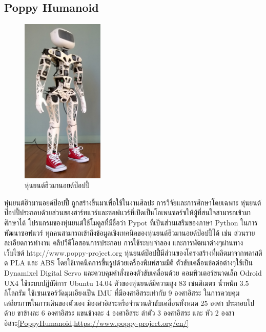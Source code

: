 \subsection*{Poppy Humanoid}
\begin{figure}[ht]
    \centering
    \includegraphics[width=0.35\textwidth]{chapter2/images/PoppyHumanoid1.png}
    \caption{หุ่นยนต์ฮิวมานอยด์ป๊อปปี้}
    \label{fig:poppy_humanoid}
\end{figure}
หุ่นยนต์ฮิวมานอยด์ป๊อปปี้ ถูกสร้างขึ้นมาเพื่อใช้ในงานศิลปะ การวิจัยและการศึกษาโดยเฉพาะ 
หุ่นยนต์ป๊อปปี้ประกอบด้วยส่วนของฮาร์ทแวร์และซอฟแวร์ที่เปิดเป็นโอเพนซอร์ซให้ผู้ที่สนใจสามารถเข้ามาศึกษาได้
โปรแกรมของหุ่นยนต์ใช้โมดูลที่มีชื่อว่า Pypot ที่เป็นส่วนเสริมของภาษา Python ในการพัฒนาซอฟแวร์
ทุกคนสามารถเข้าถึงข้อมูลเชิงเทคนิคของหุ่นยนต์ฮิวมานอยด์ป๊อปปี้ได้ เช่น ส่วนรายละเอียดการทำงาน
คลิปวีดีโอสอนการประกอบ การใช้ระบบจำลอง และการพัฒนาต่างๆผ่านทางเว็บไซต์ http://www.poppy-project.org 
หุ่นยนต์ป๊อปปี้มีส่วนของโครงสร้างที่ผลิตมาจากพลาสติด PLA และ ABS โดยใช้เทคนิคการขึ้นรูปด้วยเครื่องพิมพ์สามมิติ
ตัวขับเคลื่อนข้อต่อต่างๆใช้เป็น Dynamixel Digital Servo และควบคุมคำสั่งของตัวขับเคลื่อนด้วย 
คอมพิวเตอร์ขนาดเล็ก Odroid UX4 ใช้ระบบปฎิบัติการ Ubuntu 14.04 
ตัวของหุ่นยนต์มีความสูง 83 เซนติเมตร น้ำหนัก 3.5 กิโลกรัม 
ใช้เซนเซอร์วัดมุมเอียงเป็น IMU ที่มีองศาอิสระเท่ากับ 9 องศาอิสระ ในการควบคุมเสถียรภาพในการเดินของตัวเอง
มีองศาอิสระหรือจำนวนตัวขับเคลื่อนทั้งหมด 25 องศา ประกอบไปด้วย ขาข้างละ 6 องศาอิสระ แขนข้างละ 4 องศาอิสระ 
ลำตัว 3 องศาอิสระ และ หัว 2 องสาอิสระ\ref{PoppyHumanoid,https://www.poppy-project.org/en/}

\clearpage
